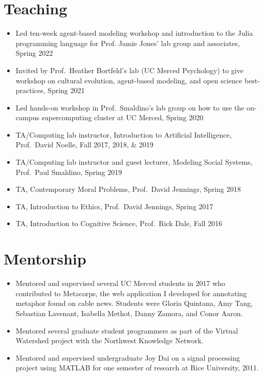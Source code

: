 \documentclass[11pt, letterpaper]{article}
\begin{document}
\section*{Teaching}

\begin{itemize}
  \item
   Led ten-week agent-based modeling workshop and introduction to the Julia
    programming language for Prof. Jamie Jones' lab group and associates,
    Spring 2022

  \item
   Invited by Prof.\ Heather Bortfeld's lab (UC Merced Psychology) to give workshop on cultural evolution, agent-based modeling, and open science best-practices, Spring 2021

 \item
   Led hands-on workshop in Prof.\ Smaldino's lab group on how to use the on-campus supercomputing cluster at UC Merced, Spring 2020

 \item
   TA/Computing lab instructor, Introduction to Artificial Intelligence, Prof.\ David Noelle, Fall 2017, 2018, \& 2019

 \item
   TA/Computing lab instructor and guest lecturer, Modeling Social Systems, Prof.\ Paul Smaldino, Spring 2019
 \item
   TA, Contemporary Moral Problems, Prof.\ David Jennings, Spring 2018
 \item
   TA, Introduction to Ethics, Prof.\ David Jennings, Spring 2017
 \item
   TA, Introduction to Cognitive Science, Prof.\ Rick Dale, Fall 2016

\end{itemize}

 \section*{Mentorship}

\begin{itemize}
  \item Mentored and supervised several UC Merced students in 2017 
    who contributed to
    Metacorps, the web application I developed for annotating metaphor found
    on cable news. Students were Gloria Quintana, Amy Tang, Sebastian Lavenant, Isabella Methot,
    Danny Zamora, and Conor Aaron.
  \item
    Mentored several graduate student programmers as part of the Virtual Watershed
    project with the Northwest Knowledge Network.
  \item Mentored and supervised undergraduate Joy Dai on a signal processing project using MATLAB for
    one semester of research at Rice University, 2011.
\end{itemize}
\end{document}
